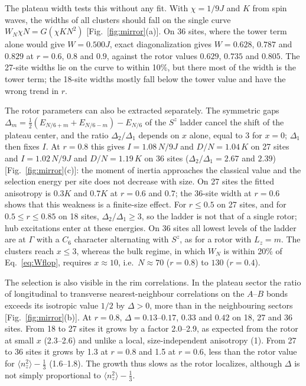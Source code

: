 \documentclass[prb,twocolumn,superscriptaddress,amsmath,amssymb,floatfix]{revtex4-2}
\begin{document}
The plateau width tests this without any fit. With $\chi=1/9J$ and $K$ from spin waves, the widths of all clusters should fall on the single curve $W_N\chi N=G(\chi KN^2)$ [Fig.~\ref{fig:mirror}(a)]. On 36 sites, where the tower term alone would give $W=0.500J$, exact diagonalization gives $W=0.628$, $0.787$ and $0.829$ at $r=0.6$, $0.8$ and $0.9$, against the rotor values $0.629$, $0.735$ and $0.805$. The 27-site widths lie on the curve to within 10\%, but there most of the width is the tower term; the 18-site widths mostly fall below the tower value and have the wrong trend in $r$.

The rotor parameters can also be extracted separately. The symmetric gaps $\Delta_m=\tfrac12(E_{N/6+m}+E_{N/6-m})-E_{N/6}$ of the $S^z$ ladder cancel the shift of the plateau center, and the ratio $\Delta_2/\Delta_1$ depends on $x$ alone, equal to 3 for $x=0$; $\Delta_1$ then fixes $I$. At $r=0.8$ this gives $I=1.08\,N/9J$ and $D/N=1.04\,K$ on 27 sites and $I=1.02\,N/9J$ and $D/N=1.19\,K$ on 36 sites ($\Delta_2/\Delta_1=2.67$ and $2.39$) [Fig.~\ref{fig:mirror}(c)]: the moment of inertia approaches the classical value and the selection energy per site does not decrease with size. On 27 sites the fitted anisotropy is $0.3K$ and $0.7K$ at $r=0.6$ and $0.7$; the 36-site width at $r=0.6$ shows that this weakness is a finite-size effect. For $r\le0.5$ on 27 sites, and for $0.5\le r\le0.85$ on 18 sites, $\Delta_2/\Delta_1\ge3$, so the ladder is not that of a single rotor; hub excitations enter at these energies. On 36 sites all lowest levels of the ladder are at $\Gamma$ with a $C_6$ character alternating with $S^z$, as for a rotor with $L_z=m$. The clusters reach $x\le3$, whereas the bulk regime, in which $W_N$ is within 20\% of Eq.~\eqref{eq:Wflop}, requires $x\approx10$, i.e.\ $N\approx70$ ($r=0.8$) to $130$ ($r=0.4$).

The selection is also visible in the rim correlations. In the plateau sector the ratio of longitudinal to transverse nearest-neighbour correlations on the $A$--$B$ bonds exceeds its isotropic value $1/2$ by $\Delta>0$, more than in the neighbouring sectors [Fig.~\ref{fig:mirror}(b)]. At $r=0.8$, $\Delta=0.13$--$0.17$, $0.33$ and $0.42$ on 18, 27 and 36 sites. From 18 to 27 sites it grows by a factor 2.0--2.9, as expected from the rotor at small $x$ (2.3--2.6) and unlike a local, size-independent anisotropy (1). From 27 to 36 sites it grows by 1.3 at $r=0.8$ and 1.5 at $r=0.6$, less than the rotor value for $\langle n_z^2\rangle-\tfrac13$ (1.6--1.8). The growth thus slows as the rotor localizes, although $\Delta$ is not simply proportional to $\langle n_z^2\rangle-\tfrac13$.
\end{document}
